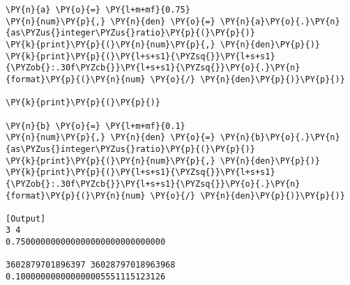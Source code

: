 \begin{Verbatim}[label=\makebox{\url{https://bitbucket.org/lbaldini/programming/src/tip/snippets/float.py}},commandchars=\\\{\}]
\PY{n}{a} \PY{o}{=} \PY{l+m+mf}{0.75}
\PY{n}{num}\PY{p}{,} \PY{n}{den} \PY{o}{=} \PY{n}{a}\PY{o}{.}\PY{n}{as\PYZus{}integer\PYZus{}ratio}\PY{p}{(}\PY{p}{)}
\PY{k}{print}\PY{p}{(}\PY{n}{num}\PY{p}{,} \PY{n}{den}\PY{p}{)}
\PY{k}{print}\PY{p}{(}\PY{l+s+s1}{\PYZsq{}}\PY{l+s+s1}{\PYZob{}:.30f\PYZcb{}}\PY{l+s+s1}{\PYZsq{}}\PY{o}{.}\PY{n}{format}\PY{p}{(}\PY{n}{num} \PY{o}{/} \PY{n}{den}\PY{p}{)}\PY{p}{)}

\PY{k}{print}\PY{p}{(}\PY{p}{)}

\PY{n}{b} \PY{o}{=} \PY{l+m+mf}{0.1}
\PY{n}{num}\PY{p}{,} \PY{n}{den} \PY{o}{=} \PY{n}{b}\PY{o}{.}\PY{n}{as\PYZus{}integer\PYZus{}ratio}\PY{p}{(}\PY{p}{)}
\PY{k}{print}\PY{p}{(}\PY{n}{num}\PY{p}{,} \PY{n}{den}\PY{p}{)}
\PY{k}{print}\PY{p}{(}\PY{l+s+s1}{\PYZsq{}}\PY{l+s+s1}{\PYZob{}:.30f\PYZcb{}}\PY{l+s+s1}{\PYZsq{}}\PY{o}{.}\PY{n}{format}\PY{p}{(}\PY{n}{num} \PY{o}{/} \PY{n}{den}\PY{p}{)}\PY{p}{)}

[Output]
3 4
0.750000000000000000000000000000

3602879701896397 36028797018963968
0.100000000000000005551115123126
\end{Verbatim}